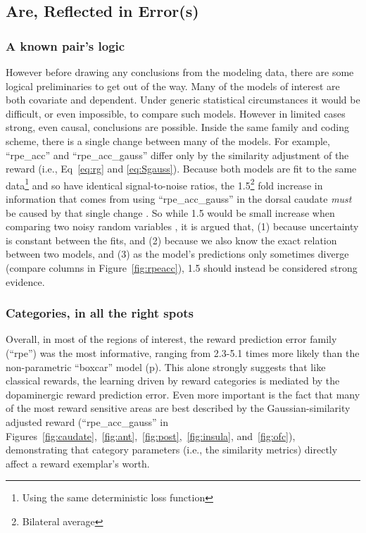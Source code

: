 \subsection{Are, Reflected in Error(s)}
\label{sub:inerror}
\subsubsection{A known pair's logic}
\label{subsub:onestep}
However before drawing any conclusions from the modeling data, there are some logical preliminaries to get out of the way.  Many of the models of interest are both covariate and dependent.  Under generic statistical circumstances it would be difficult, or even impossible, to compare such models.  However in limited cases strong, even causal, conclusions are possible.   Inside the same family and coding scheme, there is a single change between many of the models.  For example, ``rpe\_acc'' and ``rpe\_acc\_gauss'' differ only by the similarity adjustment of the reward (i.e., Eq~\ref{eq:rg} and \ref{eq:Sgauss}).  Because both models are fit to the same data\footnote{Using the same deterministic loss function} and so have identical signal-to-noise ratios, the 1.5\footnote{Bilateral average} fold increase in information that comes from using ``rpe\_acc\_gauss'' in the dorsal caudate \emph{must} be caused by that single change \citep{Pearl:2010p9726}.  So while 1.5 would be small increase when comparing two noisy random variables \citep{Anderson:2000p9475,Forster:2000p9623}, it is argued that, (1) because uncertainty is constant between the fits, and (2) because we also know the exact relation between two models, and (3) as the model's predictions only sometimes diverge (compare columns in Figure~\ref{fig:rpeacc}), 1.5 should instead be considered strong evidence.

\subsubsection{Categories, in all the right spots}
\label{subsub:rightspots}
Overall, in most of the regions of interest, the reward prediction error family (``rpe'') was the most informative, ranging from 2.3-5.1 times more likely than the non-parametric ``boxcar'' model (p\pageref{subsub:belowctx}).  This alone strongly suggests that like classical rewards, the learning driven by reward categories is mediated by the dopaminergic reward prediction error.  Even more important is the fact that many of the most reward sensitive areas are best described by the Gaussian-similarity adjusted reward (``rpe\_acc\_gauss'' in Figures~\ref{fig:caudate},~\ref{fig:ant},~\ref{fig:post},~\ref{fig:insula}, and~\ref{fig:ofc}), demonstrating that category parameters (i.e., the similarity metrics) directly affect a reward exemplar's worth.

